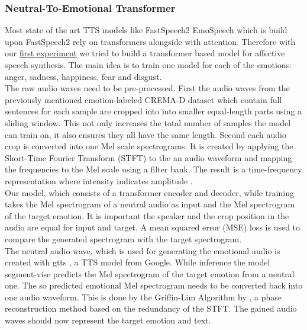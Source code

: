 \documentclass[11pt]{article}
\begin{document}
\subsubsection{Neutral-To-Emotional Transformer}
Most state of the art TTS models like FastSpeech2 \cite{ren2020fastspeech} EmoSpeech \cite{diatlova_emospeech_2023} which is build upon FastSpeech2 rely on transformers alongside with attention. Therefore with our \hyperref[Experiment 1]{first experiment} we tried to build a transformer based model for affective speech synthesis. The main idea is to train one model for each of the emotions: anger, sadness, happiness, fear and disgust. \\
The raw audio waves need to be pre-processed. First the audio waves from the previously mentioned emotion-labeled CREMA-D dataset \cite{cao_data} which contain full sentences for each sample are cropped into into smaller equal-length parts using a sliding window. This not only increases the total number of samples the model can train on, it also ensures they all have the same length. Second each audio crop is converted into one Mel scale spectrograms. It is created by applying the Short-Time Fourier Transform (STFT) to the an audio waveform and mapping the frequencies to the Mel scale using a filter bank. The result is a time-frequency representation where intensity indicates amplitude \cite{allen1977short}. \\
Our model, which consists of a transformer encoder and decoder, while training takes the Mel spectrogram of a neutral audio as input and the Mel spectrogram of the target emotion. It is important the speaker and the crop position in the audio are equal for input and target. A mean squared error (MSE) loss is used to compare the generated spectrogram with the target spectrogram. \\
The neutral audio wave, which is used for generating the emotional audio is created with gtts \cite{gtts}, a TTS model from Google. While inference the model segment-vise predicts the Mel spectrogram of the target emotion from a neutral one. The so predicted emotional Mel spectrogram needs to be converted back into one audio waveform. This is done by the Griffin-Lim Algorithm by \cite{griffin1984lim}, a phase reconstruction method based on the redundancy of the STFT. The gained audio waves should now represent the target emotion and text.
\end{document}

